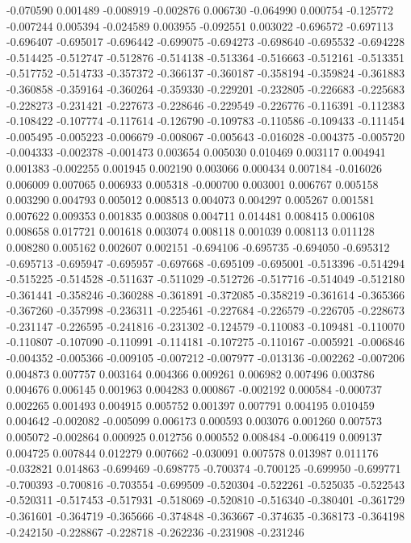 -0.070590
0.001489
-0.008919
-0.002876
0.006730
-0.064990
0.000754
-0.125772
-0.007244
0.005394
-0.024589
0.003955
-0.092551
0.003022
-0.696572
-0.697113
-0.696407
-0.695017
-0.696442
-0.699075
-0.694273
-0.698640
-0.695532
-0.694228
-0.514425
-0.512747
-0.512876
-0.514138
-0.513364
-0.516663
-0.512161
-0.513351
-0.517752
-0.514733
-0.357372
-0.366137
-0.360187
-0.358194
-0.359824
-0.361883
-0.360858
-0.359164
-0.360264
-0.359330
-0.229201
-0.232805
-0.226683
-0.225683
-0.228273
-0.231421
-0.227673
-0.228646
-0.229549
-0.226776
-0.116391
-0.112383
-0.108422
-0.107774
-0.117614
-0.126790
-0.109783
-0.110586
-0.109433
-0.111454
-0.005495
-0.005223
-0.006679
-0.008067
-0.005643
-0.016028
-0.004375
-0.005720
-0.004333
-0.002378
-0.001473
0.003654
0.005030
0.010469
0.003117
0.004941
0.001383
-0.002255
0.001945
0.002190
0.003066
0.000434
0.007184
-0.016026
0.006009
0.007065
0.006933
0.005318
-0.000700
0.003001
0.006767
0.005158
0.003290
0.004793
0.005012
0.008513
0.004073
0.004297
0.005267
0.001581
0.007622
0.009353
0.001835
0.003808
0.004711
0.014481
0.008415
0.006108
0.008658
0.017721
0.001618
0.003074
0.008118
0.001039
0.008113
0.011128
0.008280
0.005162
0.002607
0.002151
-0.694106
-0.695735
-0.694050
-0.695312
-0.695713
-0.695947
-0.695957
-0.697668
-0.695109
-0.695001
-0.513396
-0.514294
-0.515225
-0.514528
-0.511637
-0.511029
-0.512726
-0.517716
-0.514049
-0.512180
-0.361441
-0.358246
-0.360288
-0.361891
-0.372085
-0.358219
-0.361614
-0.365366
-0.367260
-0.357998
-0.236311
-0.225461
-0.227684
-0.226579
-0.226705
-0.228673
-0.231147
-0.226595
-0.241816
-0.231302
-0.124579
-0.110083
-0.109481
-0.110070
-0.110807
-0.107090
-0.110991
-0.114181
-0.107275
-0.110167
-0.005921
-0.006846
-0.004352
-0.005366
-0.009105
-0.007212
-0.007977
-0.013136
-0.002262
-0.007206
0.004873
0.007757
0.003164
0.004366
0.009261
0.006982
0.007496
0.003786
0.004676
0.006145
0.001963
0.004283
0.000867
-0.002192
0.000584
-0.000737
0.002265
0.001493
0.004915
0.005752
0.001397
0.007791
0.004195
0.010459
0.004642
-0.002082
-0.005099
0.006173
0.000593
0.003076
0.001260
0.007573
0.005072
-0.002864
0.000925
0.012756
0.000552
0.008484
-0.006419
0.009137
0.004725
0.007844
0.012279
0.007662
-0.030091
0.007578
0.013987
0.011176
-0.032821
0.014863
-0.699469
-0.698775
-0.700374
-0.700125
-0.699950
-0.699771
-0.700393
-0.700816
-0.703554
-0.699509
-0.520304
-0.522261
-0.525035
-0.522543
-0.520311
-0.517453
-0.517931
-0.518069
-0.520810
-0.516340
-0.380401
-0.361729
-0.361601
-0.364719
-0.365666
-0.374848
-0.363667
-0.374635
-0.368173
-0.364198
-0.242150
-0.228867
-0.228718
-0.262236
-0.231908
-0.231246

